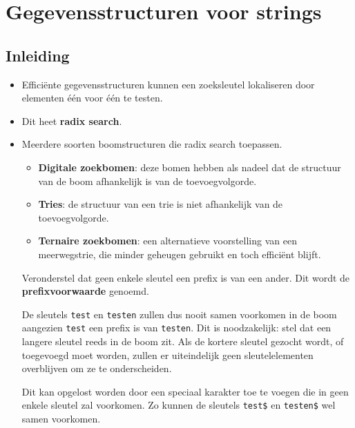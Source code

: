\chapter{Gegevensstructuren voor strings}
\section{Inleiding}
\begin{itemize}
    \item Efficiënte gegevensstructuren kunnen een zoeksleutel lokaliseren door elementen één voor één te testen.
    \item Dit heet \textbf{radix search}.
    \item Meerdere soorten boomstructuren die radix search toepassen.
    \begin{itemize}
        \item \textbf{Digitale zoekbomen}: deze bomen hebben als nadeel dat de structuur van de boom afhankelijk is van de toevoegvolgorde.
        \item \textbf{Tries}: de structuur van een trie is niet afhankelijk van de toevoegvolgorde.
        \item \textbf{Ternaire zoekbomen}: een alternatieve voorstelling van een meerwegstrie, die minder geheugen gebruikt en toch efficiënt blijft.
    \end{itemize}
    \alert Veronderstel dat geen enkele sleutel een prefix is van een ander. Dit wordt de \textbf{prefixvoorwaarde} genoemd.

    De sleutels \texttt{test} en \texttt{testen} zullen dus nooit samen voorkomen in de boom aangezien \texttt{test} een prefix is van \texttt{testen}. Dit is noodzakelijk: stel dat een langere sleutel reeds in de boom zit. Als de kortere sleutel gezocht wordt, of toegevoegd moet worden, zullen er uiteindelijk geen sleutelelementen overblijven om ze te onderscheiden.

    Dit kan opgelost worden door een speciaal karakter toe te voegen die in geen enkele sleutel zal voorkomen. Zo kunnen de sleutels \texttt{test\$} en \texttt{testen\$} wel samen voorkomen.
\end{itemize}

